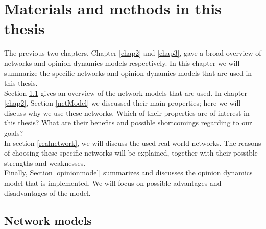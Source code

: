\documentclass[11 pt , letterpaper , twoside , openright]{book}
\begin{document}
\chapter{Materials and methods in this thesis}\label{chap4}

The previous two chapters, Chapter \ref{chap2} and \ref{chap3}, gave a broad overview of networks and opinion dynamics models respectively. In this chapter we will summarize the specific networks and opinion dynamics models that are used in this thesis. \\
\newline
Section \ref{networkmodel} gives an overview of the network models that are used. In chapter \ref{chap2}, Section \ref{netModel} we discussed their main properties; here we will discuss why we use these networks. Which of their properties are of interest in this thesis? What are their benefits and possible shortcomings regarding to our goals?\\
\newline
In section \ref{realnetwork}, we will discuss the used real-world networks. The reasons of choosing these specific networks will be explained, together with their possible strengths and weaknesses.\\ %
\newline
Finally, Section \ref{opinionmodel} summarizes and discusses the opinion dynamics model that is implemented. We will focus on possible advantages and disadvantages of the model.


\section{Network models}\label{networkmodel}
\end{document}
